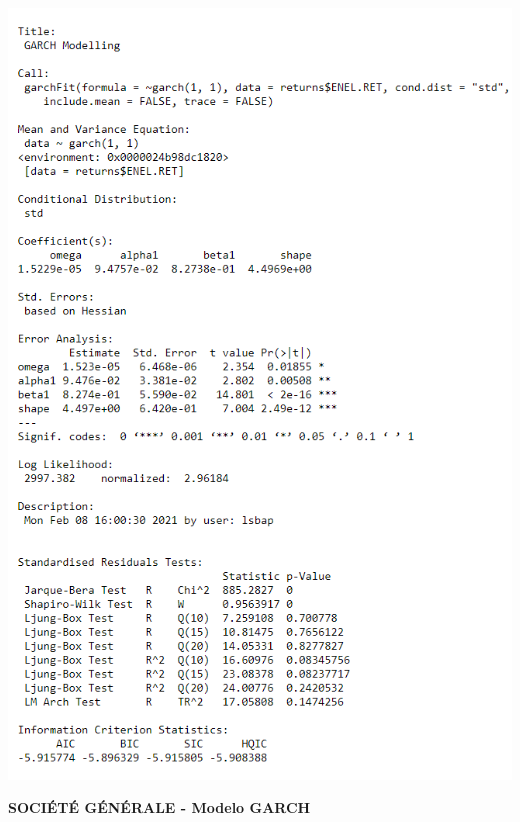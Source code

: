 \documentclass[
  12pt,
  a4paper,
  openany]{book}
\begin{document}
\begin{center}
\begin{minipage}{0.90\linewidth}
    \centering
    \includegraphics[width=2\textwidth]{image/garchenel.png}
\end{minipage}
\end{center}

\newpage

\begin{center}
 {\normalfont\Large\bfseries SOCIÉTÉ GÉNÉRALE - Modelo GARCH}
\end{center}
\end{document}
